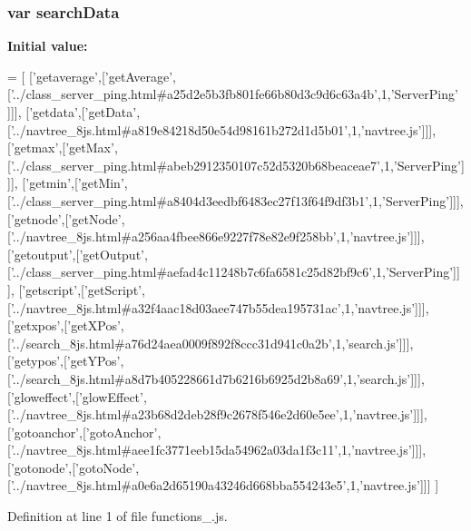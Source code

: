 \subsubsection[{search\+Data}]{\setlength{\rightskip}{0pt plus 5cm}var search\+Data}\label{functions__4_8js_ad01a7523f103d6242ef9b0451861231e}
{\bfseries Initial value\+:}
\begin{DoxyCode}
=
[
  [\textcolor{stringliteral}{'getaverage'},[\textcolor{stringliteral}{'getAverage'},[\textcolor{stringliteral}{'../class\_server\_ping.html#a25d2e5b3fb801fe66b80d3c9d6c63a4b'},1,\textcolor{stringliteral}{'ServerPing'}
      ]]],
  [\textcolor{stringliteral}{'getdata'},[\textcolor{stringliteral}{'getData'},[\textcolor{stringliteral}{'../navtree\_8js.html#a819e84218d50e54d98161b272d1d5b01'},1,\textcolor{stringliteral}{'navtree.js'}]]],
  [\textcolor{stringliteral}{'getmax'},[\textcolor{stringliteral}{'getMax'},[\textcolor{stringliteral}{'../class\_server\_ping.html#abeb2912350107c52d5320b68beaceae7'},1,\textcolor{stringliteral}{'ServerPing'}]]],
  [\textcolor{stringliteral}{'getmin'},[\textcolor{stringliteral}{'getMin'},[\textcolor{stringliteral}{'../class\_server\_ping.html#a8404d3eedbf6483ec27f13f64f9df3b1'},1,\textcolor{stringliteral}{'ServerPing'}]]],
  [\textcolor{stringliteral}{'getnode'},[\textcolor{stringliteral}{'getNode'},[\textcolor{stringliteral}{'../navtree\_8js.html#a256aa4fbee866e9227f78e82e9f258bb'},1,\textcolor{stringliteral}{'navtree.js'}]]],
  [\textcolor{stringliteral}{'getoutput'},[\textcolor{stringliteral}{'getOutput'},[\textcolor{stringliteral}{'../class\_server\_ping.html#aefad4c11248b7c6fa6581c25d82bf9c6'},1,\textcolor{stringliteral}{'ServerPing'}]]
      ],
  [\textcolor{stringliteral}{'getscript'},[\textcolor{stringliteral}{'getScript'},[\textcolor{stringliteral}{'../navtree\_8js.html#a32f4aac18d03aee747b55dea195731ac'},1,\textcolor{stringliteral}{'navtree.js'}]]],
  [\textcolor{stringliteral}{'getxpos'},[\textcolor{stringliteral}{'getXPos'},[\textcolor{stringliteral}{'../search\_8js.html#a76d24aea0009f892f8ccc31d941c0a2b'},1,\textcolor{stringliteral}{'search.js'}]]],
  [\textcolor{stringliteral}{'getypos'},[\textcolor{stringliteral}{'getYPos'},[\textcolor{stringliteral}{'../search\_8js.html#a8d7b405228661d7b6216b6925d2b8a69'},1,\textcolor{stringliteral}{'search.js'}]]],
  [\textcolor{stringliteral}{'gloweffect'},[\textcolor{stringliteral}{'glowEffect'},[\textcolor{stringliteral}{'../navtree\_8js.html#a23b68d2deb28f9c2678f546e2d60e5ee'},1,\textcolor{stringliteral}{'navtree.js'}]]],
  [\textcolor{stringliteral}{'gotoanchor'},[\textcolor{stringliteral}{'gotoAnchor'},[\textcolor{stringliteral}{'../navtree\_8js.html#aee1fc3771eeb15da54962a03da1f3c11'},1,\textcolor{stringliteral}{'navtree.js'}]]],
  [\textcolor{stringliteral}{'gotonode'},[\textcolor{stringliteral}{'gotoNode'},[\textcolor{stringliteral}{'../navtree\_8js.html#a0e6a2d65190a43246d668bba554243e5'},1,\textcolor{stringliteral}{'navtree.js'}]]]
]
\end{DoxyCode}


Definition at line 1 of file functions\+\_.\+js.

